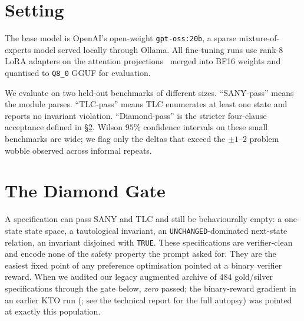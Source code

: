 \documentclass[11pt]{article}
\begin{document}
\section{Setting}
\label{sec:bg}

The base model is OpenAI's open-weight \texttt{gpt-oss:20b}, a sparse
mixture-of-experts model served locally through Ollama. All
fine-tuning runs use rank-$8$ LoRA adapters on the attention
projections~\cite{hu2022lora} merged into BF16 weights and quantised
to \texttt{Q8\_0} GGUF for evaluation.

We evaluate on two held-out benchmarks of different sizes.
``SANY-pass'' means the module parses. ``TLC-pass'' means TLC
enumerates at least one state and reports no invariant violation.
``Diamond-pass'' is the stricter four-clause acceptance defined in
\S\ref{sec:diamond}. Wilson $95\%$ confidence intervals on these
small benchmarks are wide; we flag only the deltas that exceed
the $\pm 1$--$2$ problem wobble observed across informal repeats.

\section{The Diamond Gate}
\label{sec:diamond}

A specification can pass SANY and TLC and still be behaviourally
empty: a one-state state space, a tautological invariant, an
\texttt{UNCHANGED}-dominated next-state relation, an invariant
disjoined with \texttt{TRUE}. These specifications are
verifier-clean and encode none of the safety property the prompt
asked for. They are the easiest fixed point of any preference
optimisation pointed at a binary verifier reward. When we audited our
legacy augmented archive of $484$ gold/silver specifications through
the gate below, \emph{zero} passed; the binary-reward gradient in an
earlier KTO run (\cite{ethayarajh2024kto}; see the technical report
for the full autopsy) was pointed at exactly this population.
\end{document}
